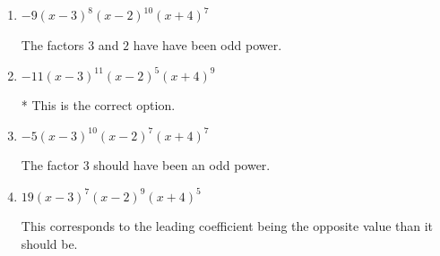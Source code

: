 \documentclass{extbook}[14pt]
\begin{document}
\begin{enumerate}
{\begin{enumerate}[label=\Alph*.]
The factor $(x - 3)$ should have an odd power and the leading coefficient should be the opposite sign.
\item \( -9(x - 3)^{8} (x - 2)^{10} (x + 4)^{7} \)

The factors $3$ and $2$ have have been odd power.
\item \( -11(x - 3)^{11} (x - 2)^{5} (x + 4)^{9} \)

* This is the correct option.
\item \( -5(x - 3)^{10} (x - 2)^{7} (x + 4)^{7} \)

The factor $3$ should have been an odd power.
\item \( 19(x - 3)^{7} (x - 2)^{9} (x + 4)^{5} \)

This corresponds to the leading coefficient being the opposite value than it should be.
\end{enumerate}

}
\end{enumerate}
\end{document}

